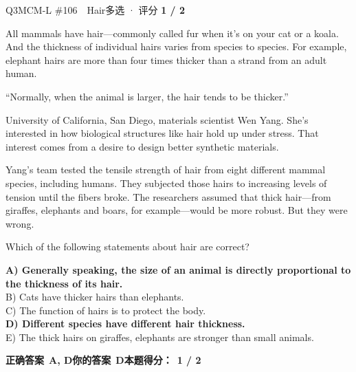 \begin{qblock}{Q3\quad MCM-L \#106\ \ Hair}{多选 · 评分 \textcolor{cAccent}{\bfseries 1 / 2}}
\begin{promptbox}
All mammals have hair---commonly called fur when it's on your cat or a koala. And the thickness of individual hairs varies from species to species. For example, elephant hairs are more than four times thicker than a strand from an adult human.

``Normally, when the animal is larger, the hair tends to be thicker.''

University of California, San Diego, materials scientist Wen Yang. She's interested in how biological structures like hair hold up under stress. That interest comes from a desire to design better synthetic materials.

Yang's team tested the tensile strength of hair from eight different mammal species, including humans. They subjected those hairs to increasing levels of tension until the fibers broke. The researchers assumed that thick hair---from giraffes, elephants and boars, for example---would be more robust. But they were wrong.
\end{promptbox}
\begin{notebox}Which of the following statements about hair are correct?\end{notebox}
{\small
{\color{cFix}\textbf{A) Generally speaking, the size of an animal is directly proportional to the thickness of its hair.}}\\
B) Cats have thicker hairs than elephants.\\
C) The function of hairs is to protect the body.\\
{\color{cFix}\textbf{D) Different species have different hair thickness.}}\\
E) The thick hairs on giraffes, elephants are stronger than small animals.}
\par\smallskip
\textbf{正确答案}\ \textcolor{cFix}{\bfseries A, D}\qquad\textbf{你的答案}\ \textcolor{cFix}{\bfseries D}\qquad\textbf{本题得分：}\ {\color{cAccent}\bfseries 1 / 2}
\end{qblock}

